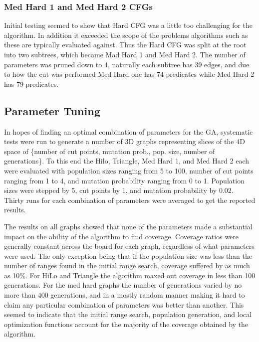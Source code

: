 \documentclass[runningheads]{llncs}
\begin{document}
\subsubsection{Med Hard 1 and Med Hard 2 CFGs}
Initial testing seemed to show that Hard CFG was a little too challenging for the algorithm. In addition it exceeded the scope of the problems algorithms such as these are typically evaluated against. Thus the Hard CFG was split at the root into two subtrees, which became Mad Hard 1 and Med Hard 2. The number of parameters was pruned down to 4, naturally each subtree has 39 edges, and due to how the cut was performed Med Hard one has 74 predicates while Med Hard 2 has 79 predicates.



\subsection{Parameter Tuning} 
In hopes of finding an optimal combination of parameters for the GA, systematic tests were run to generate a number of 3D graphs representing slices of the 4D space of \{number of cut points, mutation prob., pop. size, number of generations\}. To this end the Hilo, Triangle, Med Hard 1, and Med Hard 2 each were evaluated with population sizes ranging from 5 to 100, number of cut points ranging from 1 to 4, and mutation probability ranging from 0 to 1. Population sizes were stepped by 5, cut points by 1, and mutation probability by 0.02. Thirty runs for each combination of parameters were averaged to get the reported results. 

The results on all graphs showed that none of the parameters made a substantial impact on the ability of the algorithm to find coverage. Coverage ratios were generally constant across the board for each graph, regardless of what parameters were used. The only exception being that if the population size was less than the number of ranges found in the initial range search, coverage suffered by as much as 10\%. For HiLo and Triangle the algorithm maxed out coverage in less than 100 generations. For the med hard graphs the number of generations varied by no more than 400 generations, and in a mostly random manner making it hard to claim any particular combination of parameters was better than another. This seemed to indicate that the initial range search, population generation, and local optimization functions account for the majority of the coverage obtained by the algorithm.
\end{document}
